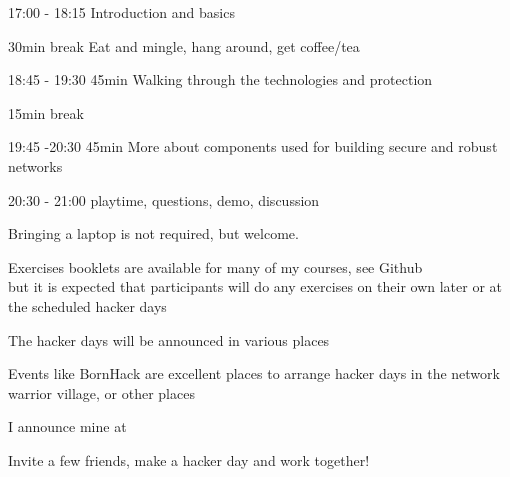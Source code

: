 \documentclass[Screen16to9,17pt]{foils}
\begin{document}
\begin{list2}
\item 17:00 - 18:15  Introduction and basics\\

\item 30min break  Eat and mingle, hang around, get coffee/tea\\

\item 18:45 - 19:30 45min Walking through the technologies and protection\\

\item 15min break\\

\item 19:45 -20:30 45min More about components used for building secure and robust networks\\

\item 20:30 - 21:00 playtime, questions, demo, discussion
\end{list2}







\begin{list2}
\item Bringing a laptop is not required, but welcome.
\item Exercises booklets are available for many of my courses, see Github\\
but it is expected that participants will do any exercises on their own later or at the scheduled hacker days
\item The hacker days will be announced in various places

\item Events like BornHack are excellent places to arrange hacker days in the network warrior village, or other places
\item I announce mine at 
\end{list2}

\vskip 1cm

\centerline{\LARGE Invite a few friends, make a hacker day and work together!}



\end{document}
